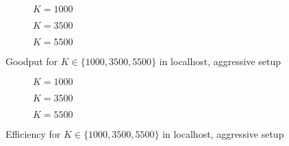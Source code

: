 \begin{figure}[t!]
\centering
\begin{subfigure}{0.24\textwidth}
	\captionsetup{justification=centering,font=scriptsize}
	\centering
	\setlength\fwidth{\textwidth}
	\setlength{}
	
	\caption{$K=1000$}
	\label{fig:lh_good_1000}
\end{subfigure}\hspace{2em}%
\begin{subfigure}{0.23\textwidth}
	\captionsetup{justification=centering,font=scriptsize}
	\centering
	\setlength\fwidth{\textwidth}
	\setlength{}
	
	\caption{$K=3500$}
	\label{fig:lh_good_3500}
\end{subfigure}\hspace{2em}%
\begin{subfigure}{0.23\textwidth}
	\captionsetup{justification=centering,font=scriptsize}
	\centering
	\setlength\fwidth{\textwidth}
	\setlength{}
	
	\caption{$K=5500$}
	\label{fig:lh_good_5500}
\end{subfigure}
\caption{Goodput for $K \in \{1000, 3500, 5500\}$ in localhost, aggressive setup}
\label{fig:goodput_aggr}
\end{figure}

\begin{figure}[t!]
\centering
\begin{subfigure}{0.23\textwidth}
	\captionsetup{justification=centering,font=scriptsize}
	\centering
	\setlength\fwidth{\textwidth}
	\setlength{}
	
	\caption{$K=1000$}
	\label{fig:lh_eff_1000}
\end{subfigure}\hspace{2em}%
\begin{subfigure}{0.23\textwidth}
	\captionsetup{justification=centering,font=scriptsize}
	\centering
	\setlength\fwidth{\textwidth}
	\setlength{}
	
	\caption{$K=3500$}
	\label{fig:lh_eff_3500}
\end{subfigure}\hspace{2em}%
\begin{subfigure}{0.23\textwidth}
	\captionsetup{justification=centering,font=scriptsize}
	\centering
	\setlength\fwidth{\textwidth}
	\setlength{}
	
	\caption{$K=5500$}
	\label{fig:lh_eff_5500}
\end{subfigure}
\caption{Efficiency for $K \in \{1000, 3500, 5500\}$ in localhost, aggressive setup}
\label{fig:efficiency_aggr}
\end{figure}

